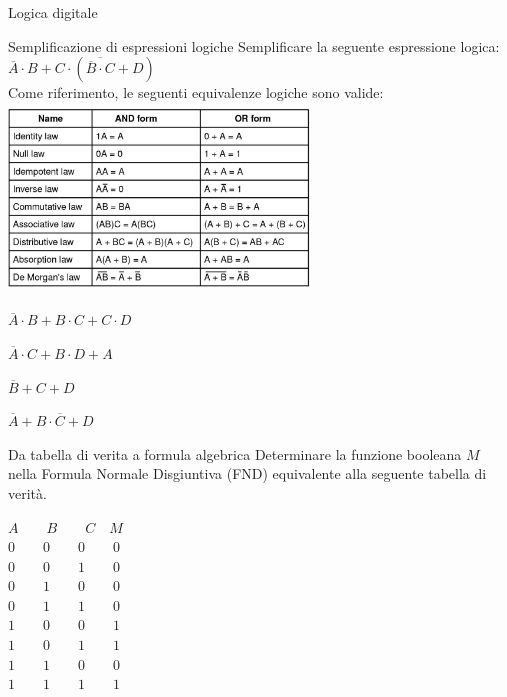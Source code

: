 \documentclass[11pt]{article}
\begin{document}
\begin{quiz}{Logica digitale}
\begin{multi}[points=1,shuffle=true]{Semplificazione di espressioni logiche}
    Semplificare la seguente espressione logica: \\

    $\overline{A} \cdot B + C \cdot (\overline{\overline{B} \cdot C} + D)$\\

    Come riferimento, le seguenti equivalenze logiche sono valide:\\

    \includegraphics[width=8cm,height=5cm]{figures/logica.png}

    \item* $\overline{A} \cdot B + B \cdot C + C \cdot D$
    \item $\overline{A} \cdot C + B \cdot D + A$
    \item $\overline{B} + C + D$
    \item $\overline{A}  + B \cdot \overline{C} + D$
\end{multi}

\begin{multi}[points=1,shuffle=true]{Da tabella di verita a formula algebrica}
    Determinare la funzione booleana $M$ nella Formula Normale Disgiuntiva (FND) equivalente alla seguente tabella di verit\`{a}.

    $A \qquad  B \qquad  C \quad M$ \\
    $0 \qquad 0 \qquad 0 \qquad 0$ \\
    $0 \qquad 0 \qquad 1 \qquad 0$ \\
    $0 \qquad 1 \qquad 0 \qquad 0$ \\
    $0 \qquad 1 \qquad 1 \qquad 0$ \\
    $1 \qquad 0 \qquad 0 \qquad 1$ \\
    $1 \qquad 0 \qquad 1 \qquad 1$ \\
    $1 \qquad 1 \qquad 0 \qquad 0$ \\
    $1 \qquad 1 \qquad 1 \qquad 1$ \\
    

\end{multi}
\end{quiz}
\end{document}
